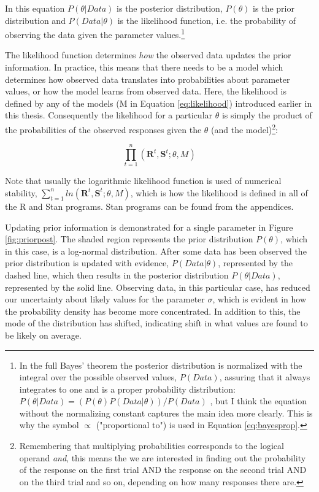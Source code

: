 \documentclass{article}\usepackage{knitr}
\begin{document}
In this equation $P(\theta | Data)$ is the posterior distribution, $P(\theta)$ is the prior distribution and $P(Data | \theta)$ is the likelihood function, i.e. the probability of observing the data given the parameter values.\footnote{In the full Bayes' theorem the posterior distribution is normalized with the integral over the possible observed values, $P(Data)$, assuring that it always integrates to one and is a proper probability distribution: $P(\theta | Data) = (P(\theta) P(Data | \theta)) / P(Data)$ \citep{kruschke2015}, but I think the equation without the normalizing constant captures the main idea more clearly. This is why the symbol $\propto$ ("proportional to") is used in Equation \ref{eq:bayesprop}.} 

The likelihood function determines \textit{how} the observed data updates the prior information. In practice, this means that there needs to be a model which determines how observed data translates into probabilities about parameter values, or how the model learns from observed data. Here, the likelihood is defined by any of the models (M in Equation \ref{eq:likelihood}) introduced earlier in this thesis. Consequently the likelihood for a particular $\theta$ is simply the product of the probabilities of the observed responses given the $\theta$ (and the model)\footnote{Remembering that multiplying probabilities corresponds to the logical operand \textit{and}, this means the we are interested in finding out the probability of the response on the first trial AND the response on the second trial AND on the third trial and so on, depending on how many responses there are.}:

\begin{equation}
\prod_{t=1}^n (\bm{R}^t, \bm{S}^t; \theta, M)
\label{eq:likelihood}
\end{equation}

Note that usually the logarithmic likelihood function is used of numerical stability, $\sum_{t=1}^n ln (\bm{R}^t, \bm{S}^t; \theta, M)$, which is how the likelihood is defined in all of the R and Stan programs. Stan programs can be found from the appendices. 

Updating prior information is demonstrated for a single parameter in Figure \ref{fig:priorpost}. The shaded region represents the prior distribution $P(\theta)$, which in this case, is a log-normal distribution.  After some data has been observed the prior distribution is updated with evidence, $P(Data | \theta)$, represented by the dashed line, which then results in the posterior distribution $P(\theta | Data)$, represented by the solid line. Observing data, in this particular case, has reduced our uncertainty about likely values for the parameter $\sigma$, which is evident in how the probability density has become more concentrated. In addition to this, the mode of the distribution has shifted, indicating shift in what values are found to be likely on average.
\end{document}
